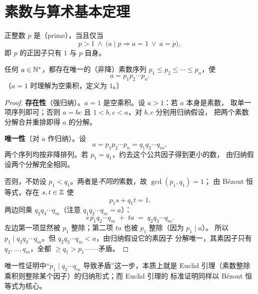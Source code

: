 \section{素数与算术基本定理}\label{sec:fta}

\begin{definition}[素数]
正整数 $p$ 是（prime），当且仅当
\[
  p>1\ \wedge\ \bigl(a\mid p \Rightarrow a=1\ \vee\ a=p\bigr),
\]
即 $p$ 的正因子只有 $1$ 与 $p$ 自身。
\end{definition}

\begin{theorem}[算术基本定理]\label{thm:fta}
任何 $a\in\mathbb{N}^{*}$，都存在唯一的（非降）素数序列
$p_1\le p_2\le\cdots\le p_n$，使
\[
  a=p_1p_2\cdots p_n.
\]
（$a=1$ 时理解为空乘积，定义为 $1$。）
\end{theorem}

\begin{proof}
\textbf{存在性}（强归纳）。$a=1$ 是空乘积。设 $a>1$：若 $a$ 本身是素数，
取单一项序列即可；否则 $a=bc$ 且 $1<b,c<a$，对 $b,c$ 分别用归纳假设，
把两个素数分解合并重排即得 $a$ 的分解。

\textbf{唯一性}（对 $a$ 作归纳）。设
\[
  a=p_1p_2\cdots p_n=q_1q_2\cdots q_m,
\]
两个序列均按非降排列。若 $p_1=q_1$，约去这个公共因子得到更小的数，
由归纳假设两个分解完全相同。

否则，不妨设 $p_1<q_1$。两者是\emph{不同的}素数，故 $\gcd(p_1,q_1)=1$；
由 Bézout 恒等式，存在 $s,t\in\mathbb{Z}$ 使
\[
  p_1s+q_1t=1.
\]
两边同乘 $q_2q_3\cdots q_m$（注意 $q_1q_2\cdots q_m=a$）：
\[
  s\,p_1q_2\cdots q_m \;+\; ta \;=\; q_2q_3\cdots q_m.
\]
左边第一项显然被 $p_1$ 整除；第二项 $ta$ 也被 $p_1$ 整除（因为 $p_1\mid a$）。
所以 $p_1\mid q_2q_3\cdots q_m$。但 $q_2q_3\cdots q_m<a$，由归纳假设它的素因子
分解唯一，其素因子只有 $q_2,\ldots,q_m$，全都 $\ge q_1>p_1$——矛盾。
\end{proof}

\begin{remark}
唯一性证明中“$p_1\mid q_2\cdots q_m$ 导致矛盾”这一步，本质上就是
Euclid 引理（素数整除乘积则整除某个因子）的归纳形式；而 Euclid 引理的
标准证明同样以 Bézout 恒等式为核心。
\end{remark}
